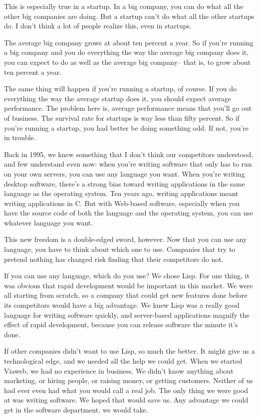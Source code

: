This is especially true in a startup. In a big company, you can do what
all the other big companies are doing. But a startup can't do what all
the other startups do. I don't think a lot of people realize this, even
in startups.

The average big company grows at about ten percent a year. So if you're
running a big company and you do everything the way the average big
company does it, you can expect to do as well as the average big
company-- that is, to grow about ten percent a year.

The same thing will happen if you're running a startup, of course. If
you do everything the way the average startup does it, you should expect
average performance. The problem here is, average performance means that
you'll go out of business. The survival rate for startups is way less
than fifty percent. So if you're running a startup, you had better be
doing something odd. If not, you're in trouble.

Back in 1995, we knew something that I don't think our competitors
understood, and few understand even now: when you're writing software
that only has to run on your own servers, you can use any language you
want. When you're writing desktop software, there's a strong bias toward
writing applications in the same language as the operating system. Ten
years ago, writing applications meant writing applications in C. But
with Web-based software, especially when you have the source code of
both the language and the operating system, you can use whatever
language you want.

This new freedom is a double-edged sword, however. Now that you can use
any language, you have to think about which one to use. Companies that
try to pretend nothing has changed risk finding that their competitors
do not.

If you can use any language, which do you use? We chose Lisp. For one
thing, it was obvious that rapid development would be important in this
market. We were all starting from scratch, so a company that could get
new features done before its competitors would have a big advantage. We
knew Lisp was a really good language for writing software quickly, and
server-based applications magnify the effect of rapid development,
because you can release software the minute it's done.

If other companies didn't want to use Lisp, so much the better. It might
give us a technological edge, and we needed all the help we could get.
When we started Viaweb, we had no experience in business. We didn't know
anything about marketing, or hiring people, or raising money, or getting
customers. Neither of us had ever even had what you would call a real
job. The only thing we were good at was writing software. We hoped that
would save us. Any advantage we could get in the software department, we
would take.

